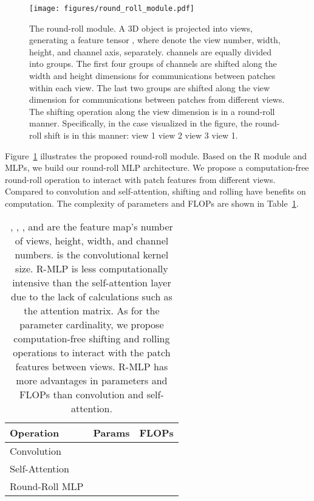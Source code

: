 \documentclass[11pt]{article}
\begin{document}
\newpage


\begin{figure}[ht]
\centering
\texttt{[image: figures/round\_roll\_module.pdf]}

\vspace{0.1in}

\caption{
The round-roll module. A 3D object is projected into  views, generating a feature tensor , where  denote the view number, width, height, and channel axis, separately.  channels are equally divided into  groups. The first four groups of channels are shifted along the width and height dimensions for communications between patches within each view. The last two groups are shifted along the view dimension for communications between patches from different views. The shifting operation along the view dimension is in a round-roll manner. Specifically, in the case visualized in the figure, the round-roll shift is in this manner: view 1  view 2  view 3  view 1.
}\label{fig:roll}\vspace{0.2in}
\end{figure}

Figure~\ref{fig:roll}  illustrates the proposed round-roll module. Based on the R module and MLPs,  we build our round-roll MLP architecture.
We propose a computation-free round-roll operation to interact with patch features from different views.
Compared to convolution and self-attention, shifting and rolling have benefits on computation. The complexity of parameters and FLOPs are shown in Table~\ref{tab:complexity}.


\vspace{0.4in}


\begin{table}[h!]
\caption{
, , , and  are the feature map's number of views, height, width, and channel numbers.  is the convolutional kernel size.
R-MLP is less computationally intensive than the self-attention layer due to the lack of calculations such as the attention matrix. As for the parameter cardinality, we propose computation-free shifting and rolling operations to interact with the patch features between views.
R-MLP has more advantages in parameters and FLOPs than convolution and self-attention.
}
\label{tab:complexity}
\centering
\begin{tabular}{lll}
\toprule
Operation & Params & FLOPs \\
\midrule
Convolution &  &  \\
Self-Attention &  &  \\
Round-Roll MLP &  & \\
\bottomrule
\end{tabular}
\end{table}
\end{document}

